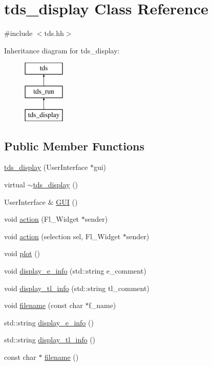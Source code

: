 \hypertarget{classtds__display}{\section{tds\-\_\-display Class Reference}
\label{classtds__display}
}


{\ttfamily \#include $<$tds.\-hh$>$}

Inheritance diagram for tds\-\_\-display\-:\begin{figure}[H]
\begin{center}
\leavevmode
\includegraphics[height=3.000000cm]{classtds__display}
\end{center}
\end{figure}
\subsection*{Public Member Functions}
\begin{DoxyCompactItemize}
\item 
\hyperlink{classtds__display_a4e3eff614025d24fbe8204f98e68b6ce}{tds\-\_\-display} (User\-Interface $\ast$gui)
\item 
virtual \hyperlink{classtds__display_ab31b0f507587abe8aa7acd158e33b0bb}{$\sim$tds\-\_\-display} ()
\item 
User\-Interface \& \hyperlink{classtds__display_ac57fee94adb87f1306e35a3fd1766465}{G\-U\-I} ()
\item 
void \hyperlink{classtds__display_a52823b7451d3afc18eb4a712bb891125}{action} (Fl\-\_\-\-Widget $\ast$sender)
\item 
void \hyperlink{classtds__display_a7135e1577eaab18c500dd503b2b33b0b}{action} (selection sel, Fl\-\_\-\-Widget $\ast$sender)
\item 
void \hyperlink{classtds__display_a86b3c6ef9fe9d846544ce123b325ed40}{plot} ()
\item 
void \hyperlink{classtds__display_a1f5bb8fbcde47a194726ab95aa79e8eb}{display\-\_\-e\-\_\-info} (std\-::string e\-\_\-comment)
\item 
void \hyperlink{classtds__display_ac625020bac2a68d6ab799d37d7b009ea}{display\-\_\-tl\-\_\-info} (std\-::string tl\-\_\-comment)
\item 
void \hyperlink{classtds__display_a188fdc90ab4370b5d1b0b625074ce593}{filename} (const char $\ast$f\-\_\-name)
\item 
std\-::string \hyperlink{classtds__display_aec9a54ceed140fee7120cbf0e7b5d7d8}{display\-\_\-e\-\_\-info} ()
\item 
std\-::string \hyperlink{classtds__display_a1f28ae49914313afc6eb7f218d3cf8bb}{display\-\_\-tl\-\_\-info} ()
\item 
const char $\ast$ \hyperlink{classtds__display_ada7b81a067803aeb6ff761eb9de7a36b}{filename} ()
\end{DoxyCompactItemize}
